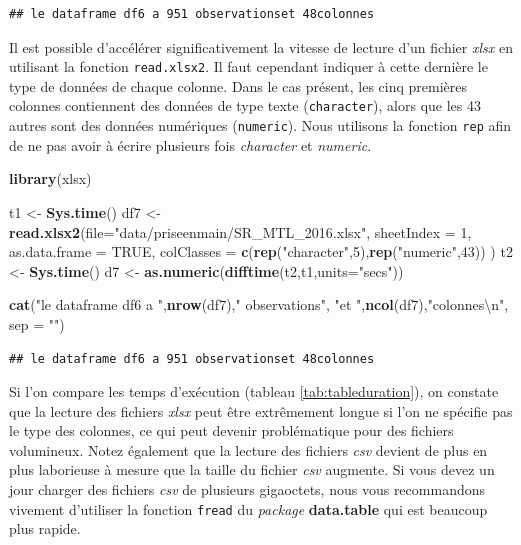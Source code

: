 \documentclass[
  11pt,
  french,
]{book}
\makeatletter
\newenvironment{Shaded}{\begin{snugshade}}{\end{snugshade}}
\newcommand{\CharTok}[1]{\textcolor[rgb]{0.31,0.60,0.02}{#1}}
\newcommand{\DataTypeTok}[1]{\textcolor[rgb]{0.13,0.29,0.53}{#1}}
\newcommand{\DecValTok}[1]{\textcolor[rgb]{0.00,0.00,0.81}{#1}}
\newcommand{\KeywordTok}[1]{\textcolor[rgb]{0.13,0.29,0.53}{\textbf{#1}}}
\newcommand{\NormalTok}[1]{#1}
\newcommand{\OtherTok}[1]{\textcolor[rgb]{0.56,0.35,0.01}{#1}}
\newcommand{\StringTok}[1]{\textcolor[rgb]{0.31,0.60,0.02}{#1}}
\newenvironment{kframe}{%
\medskip{}
\setlength{\fboxsep}{.8em}
 \def\at@end@of@kframe{}%
 \ifinner\ifhmode%
  \def\at@end@of@kframe{\end{minipage}}%
  \begin{minipage}{\columnwidth}%
 \fi\fi%
 \def\FrameCommand##1{\hskip\@totalleftmargin \hskip-\fboxsep
 \colorbox{shadecolor}{##1}\hskip-\fboxsep
     \hskip-\linewidth \hskip-\@totalleftmargin \hskip\columnwidth}%
 \MakeFramed {\advance\hsize-\width
   \@totalleftmargin\z@ \linewidth\hsize
   \@setminipage}}%
 {\par\unskip\endMakeFramed%
 \at@end@of@kframe}
\renewenvironment{Shaded}{\begin{kframe}}{\end{kframe}}
\makeatother
\begin{document}
\begin{verbatim}
## le dataframe df6 a 951 observationset 48colonnes
\end{verbatim}

Il est possible d'accélérer significativement la vitesse de lecture d'un fichier \emph{xlsx} en utilisant la fonction \texttt{read.xlsx2}. Il faut cependant indiquer à cette dernière le type de données de chaque colonne. Dans le cas présent, les cinq premières colonnes contiennent des données de type texte (\texttt{character}), alors que les 43 autres sont des données numériques (\texttt{numeric}). Nous utilisons la fonction \texttt{rep} afin de ne pas avoir à écrire plusieurs fois \emph{character} et \emph{numeric}.

\begin{Shaded}
\begin{Highlighting}[]
\KeywordTok{library}\NormalTok{(xlsx)}

\NormalTok{t1 <-}\StringTok{ }\KeywordTok{Sys.time}\NormalTok{()}
\NormalTok{df7 <-}\StringTok{ }\KeywordTok{read.xlsx2}\NormalTok{(}\DataTypeTok{file=}\StringTok{"data/priseenmain/SR_MTL_2016.xlsx"}\NormalTok{,}
                  \DataTypeTok{sheetIndex =} \DecValTok{1}\NormalTok{, }
                  \DataTypeTok{as.data.frame =} \OtherTok{TRUE}\NormalTok{,}
                  \DataTypeTok{colClasses =} \KeywordTok{c}\NormalTok{(}\KeywordTok{rep}\NormalTok{(}\StringTok{"character"}\NormalTok{,}\DecValTok{5}\NormalTok{),}\KeywordTok{rep}\NormalTok{(}\StringTok{"numeric"}\NormalTok{,}\DecValTok{43}\NormalTok{))}
\NormalTok{                  )}
\NormalTok{t2 <-}\StringTok{ }\KeywordTok{Sys.time}\NormalTok{()}
\NormalTok{d7 <-}\StringTok{ }\KeywordTok{as.numeric}\NormalTok{(}\KeywordTok{difftime}\NormalTok{(t2,t1,}\DataTypeTok{units=}\StringTok{"secs"}\NormalTok{))}

\KeywordTok{cat}\NormalTok{(}\StringTok{"le dataframe df6 a "}\NormalTok{,}\KeywordTok{nrow}\NormalTok{(df7),}\StringTok{" observations"}\NormalTok{,}
    \StringTok{"et "}\NormalTok{,}\KeywordTok{ncol}\NormalTok{(df7),}\StringTok{"colonnes}\CharTok{\textbackslash{}n}\StringTok{"}\NormalTok{, }\DataTypeTok{sep =} \StringTok{""}\NormalTok{)}
\end{Highlighting}
\end{Shaded}

\begin{verbatim}
## le dataframe df6 a 951 observationset 48colonnes
\end{verbatim}

Si l'on compare les temps d'exécution (tableau \ref{tab:tableduration}), on constate que la lecture des fichiers \emph{xlsx} peut être extrêmement longue si l'on ne spécifie pas le type des colonnes, ce qui peut devenir problématique pour des fichiers volumineux. Notez également que la lecture des fichiers \emph{csv} devient de plus en plus laborieuse à mesure que la taille du fichier \emph{csv} augmente. Si vous devez un jour charger des fichiers \emph{csv} de plusieurs gigaoctets, nous vous recommandons vivement d'utiliser la fonction \texttt{fread} du \emph{package} \textbf{data.table} qui est beaucoup plus rapide.
\end{document}
